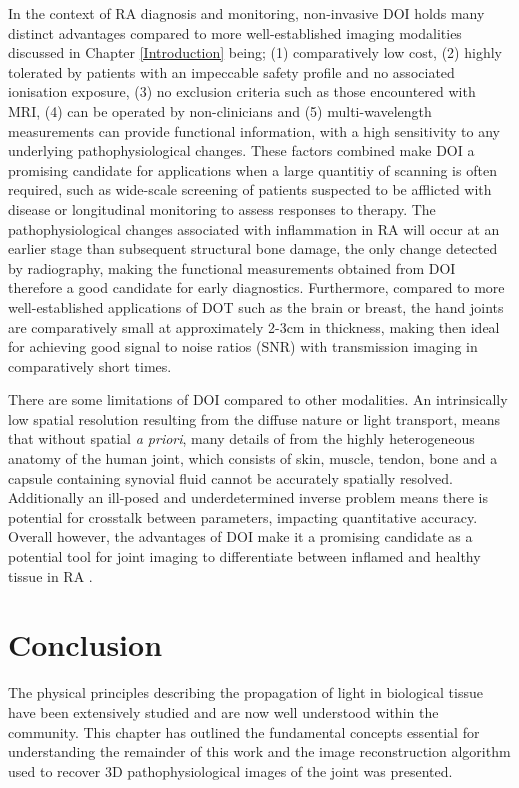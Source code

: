 \documentclass[twoside]{bhamthesis}
\theoremstyle{definition}
\begin{document}
In the context of RA diagnosis and monitoring, non-invasive DOI holds many distinct advantages compared to more well-established imaging modalities discussed in Chapter \ref{Introduction} being; (1) comparatively low cost, (2) highly tolerated by patients with an impeccable safety profile and no associated ionisation exposure, (3) no exclusion criteria such as those encountered with MRI, (4) can be operated by non-clinicians and (5) multi-wavelength measurements can provide functional information, with a high sensitivity to any underlying pathophysiological changes. These factors combined make DOI a promising candidate for applications when a large quantitiy of scanning is often required, such as wide-scale screening of patients suspected to be afflicted with disease or longitudinal monitoring to assess responses to therapy. The pathophysiological changes associated with inflammation in RA will occur at an earlier stage than subsequent structural bone damage, the only change detected by radiography, making the functional measurements obtained from DOI therefore a good candidate for early diagnostics. Furthermore, compared to more well-established applications of DOT such as the brain or breast, the hand joints are comparatively small at approximately 2-3cm in thickness, making then ideal for achieving good signal to noise ratios (SNR) with transmission imaging in comparatively short times.

There are some limitations of DOI compared to other modalities. An intrinsically low spatial resolution resulting from the diffuse nature or light transport, means that without spatial \textit{a priori}, many details of from the highly heterogeneous anatomy of the human joint, which consists of skin, muscle, tendon, bone and a capsule containing synovial fluid cannot be accurately spatially resolved. Additionally an ill-posed and underdetermined inverse problem means there is potential for crosstalk between parameters, impacting quantitative accuracy. Overall however, the advantages of DOI make it a promising candidate as a potential tool for joint imaging to differentiate between inflamed and healthy tissue in RA \cite{golovko2011optical}. 

\section{Conclusion}

The physical principles describing the propagation of light in biological tissue have been extensively studied and are now well understood within the community. This chapter has outlined the fundamental concepts essential for understanding the remainder of this work and the image reconstruction algorithm used to recover 3D pathophysiological images of the joint was presented. 
\end{document}

